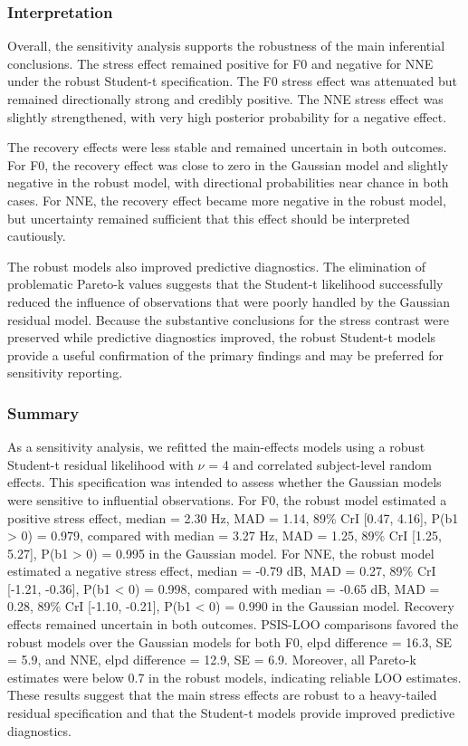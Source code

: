 \documentclass[
  english,
  man,floatsintext]{apa6}
\begin{document}
\subsubsection{Interpretation}\label{interpretation-1}

Overall, the sensitivity analysis supports the robustness of the main inferential conclusions. The stress effect remained positive for F0 and negative for NNE under the robust Student-t specification. The F0 stress effect was attenuated but remained directionally strong and credibly positive. The NNE stress effect was slightly strengthened, with very high posterior probability for a negative effect.

The recovery effects were less stable and remained uncertain in both outcomes. For F0, the recovery effect was close to zero in the Gaussian model and slightly negative in the robust model, with directional probabilities near chance in both cases. For NNE, the recovery effect became more negative in the robust model, but uncertainty remained sufficient that this effect should be interpreted cautiously.

The robust models also improved predictive diagnostics. The elimination of problematic Pareto-k values suggests that the Student-t likelihood successfully reduced the influence of observations that were poorly handled by the Gaussian residual model. Because the substantive conclusions for the stress contrast were preserved while predictive diagnostics improved, the robust Student-t models provide a useful confirmation of the primary findings and may be preferred for sensitivity reporting.

\subsubsection{Summary}\label{summary}

As a sensitivity analysis, we refitted the main-effects models using a robust Student-t residual likelihood with \(\nu\) = 4 and correlated subject-level random effects. This specification was intended to assess whether the Gaussian models were sensitive to influential observations. For F0, the robust model estimated a positive stress effect, median = 2.30 Hz, MAD = 1.14, 89\% CrI {[}0.47, 4.16{]}, P(b1 \textgreater{} 0) = 0.979, compared with median = 3.27 Hz, MAD = 1.25, 89\% CrI {[}1.25, 5.27{]}, P(b1 \textgreater{} 0) = 0.995 in the Gaussian model. For NNE, the robust model estimated a negative stress effect, median = -0.79 dB, MAD = 0.27, 89\% CrI {[}-1.21, -0.36{]}, P(b1 \textless{} 0) = 0.998, compared with median = -0.65 dB, MAD = 0.28, 89\% CrI {[}-1.10, -0.21{]}, P(b1 \textless{} 0) = 0.990 in the Gaussian model. Recovery effects remained uncertain in both outcomes. PSIS-LOO comparisons favored the robust models over the Gaussian models for both F0, elpd difference = 16.3, SE = 5.9, and NNE, elpd difference = 12.9, SE = 6.9. Moreover, all Pareto-k estimates were below 0.7 in the robust models, indicating reliable LOO estimates. These results suggest that the main stress effects are robust to a heavy-tailed residual specification and that the Student-t models provide improved predictive diagnostics.
\end{document}
